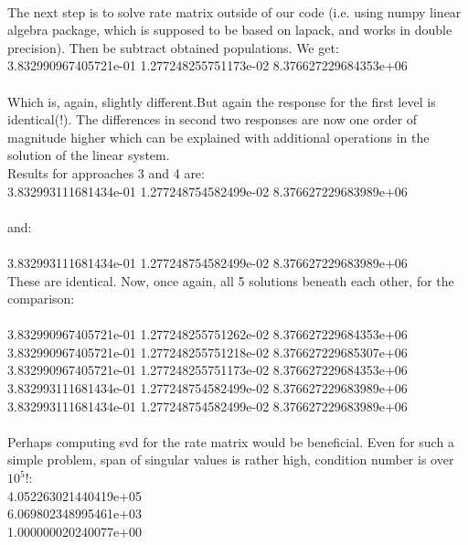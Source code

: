 \documentclass[a4paper,10pt]{article}
\begin{document}
\\
The next step is to solve rate matrix outside of our code (i.e. using numpy linear algebra package, which is supposed to be based on lapack, and works in double precision). Then be subtract obtained populations. We get:\\
3.832990967405721e-01 1.277248255751173e-02 8.376627229684353e+06\\
\\
Which is, again, slightly different.But again the response for the first level is identical(!). The differences in second two responses are now one order of magnitude higher which can be explained with additional operations in the solution of the linear system.
\\
Results for approaches 3 and 4 are:\\
3.832993111681434e-01 1.277248754582499e-02 8.376627229683989e+06\\
\\
and:\\
\\
3.832993111681434e-01 1.277248754582499e-02 8.376627229683989e+06
\\
These are identical. Now, once again, all 5 solutions beneath each other, for the comparison:\\
\\
3.832990967405721e-01 1.277248255751262e-02 8.376627229684353e+06\\
3.832990967405721e-01 1.277248255751218e-02 8.376627229685307e+06\\
3.832990967405721e-01 1.277248255751173e-02 8.376627229684353e+06\\
3.832993111681434e-01 1.277248754582499e-02 8.376627229683989e+06\\
3.832993111681434e-01 1.277248754582499e-02 8.376627229683989e+06\\
\\
Perhaps computing svd for the rate matrix would be beneficial. Even for such a simple problem, span of singular values is rather high, condition number is over $10^5$!:\\
4.052263021440419e+05\\   
6.069802348995461e+03\\   
1.000000020240077e+00\\
\end{document}
